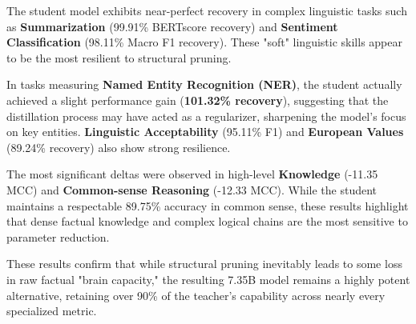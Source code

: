 \documentclass{article}
\begin{document}
The student model exhibits near-perfect recovery in complex linguistic tasks such as \textbf{Summarization} (99.91\% BERTscore recovery) and \textbf{Sentiment Classification} (98.11\% Macro F1 recovery). These "soft" linguistic skills appear to be the most resilient to structural pruning.

In tasks measuring \textbf{Named Entity Recognition (NER)}, the student actually achieved a slight performance gain (\textbf{101.32\% recovery}), suggesting that the distillation process may have acted as a regularizer, sharpening the model's focus on key entities. \textbf{Linguistic Acceptability} (95.11\% F1) and \textbf{European Values} (89.24\% recovery) also show strong resilience.

The most significant deltas were observed in high-level \textbf{Knowledge} (-11.35 MCC) and \textbf{Common-sense Reasoning} (-12.33 MCC). While the student maintains a respectable 89.75\% accuracy in common sense, these results highlight that dense factual knowledge and complex logical chains are the most sensitive to parameter reduction.

These results confirm that while structural pruning inevitably leads to some loss in raw factual "brain capacity," the resulting 7.35B model remains a highly potent alternative, retaining over 90\% of the teacher's capability across nearly every specialized metric.
\end{document}
